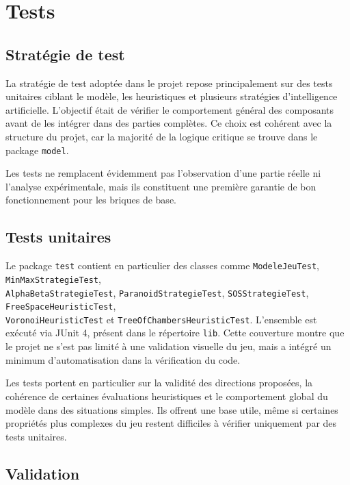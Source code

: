 \documentclass[11pt,a4paper]{article}
\begin{document}
\section{Tests}
\subsection{Stratégie de test}

La stratégie de test adoptée dans le projet repose principalement sur des tests unitaires ciblant le modèle, les heuristiques et plusieurs stratégies d'intelligence artificielle. L'objectif était de vérifier le comportement général des composants avant de les intégrer dans des parties complètes. Ce choix est cohérent avec la structure du projet, car la majorité de la logique critique se trouve dans le package \texttt{model}.

Les tests ne remplacent évidemment pas l'observation d'une partie réelle ni l'analyse expérimentale, mais ils constituent une première garantie de bon fonctionnement pour les briques de base.

\subsection{Tests unitaires}

Le package \texttt{test} contient en particulier des classes comme \texttt{ModeleJeuTest}, \texttt{MinMaxStrategieTest}, \\\texttt{AlphaBetaStrategieTest}, \texttt{ParanoidStrategieTest}, \texttt{SOSStrategieTest}, \texttt{FreeSpaceHeuristicTest}, \\\texttt{VoronoiHeuristicTest} et \texttt{TreeOfChambersHeuristicTest}. L'ensemble est exécuté via JUnit 4, présent dans le répertoire \texttt{lib}. Cette couverture montre que le projet ne s'est pas limité à une validation visuelle du jeu, mais a intégré un minimum d'automatisation dans la vérification du code.

Les tests portent en particulier sur la validité des directions proposées, la cohérence de certaines évaluations heuristiques et le comportement global du modèle dans des situations simples. Ils offrent une base utile, même si certaines propriétés plus complexes du jeu restent difficiles à vérifier uniquement par des tests unitaires.

\subsection{Validation}
\end{document}
